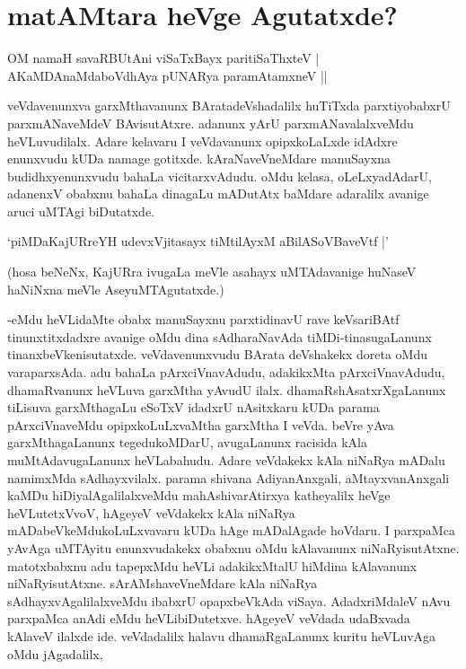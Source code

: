 \chapter{matAMtara heVge Agutatxde?}

\begin{shloka}
OM namaH savaRBUtAni viSaTxBayx paritiSaThxteV |\\
AKaMDAnaMdaboVdhAya pUNARya paramAtamxneV ||
\end{shloka}

veVdavenunxva garxMthavanunx BAratadeVshadalilx huTiTxda parxtiyobabxrU parxmANaveMdeV BAvisutAtxre. adanunx yArU parxmANavalalxveMdu heVLuvudilalx. Adare kelavaru I veVdavanunx opipxkoLaLxde idAdxre enunxvudu kUDa namage gotitxde. kAraNaveVneMdare manuSayxna budidhxyenunxvudu bahaLa vicitarxvAdudu. oMdu kelasa, oLeLxyadAdarU, adanenxV obabxnu bahaLa dinagaLu mADutAtx baMdare adaralilx avanige aruci uMTAgi biDutatxde.

\begin{shloka}
`piMDaKajURreYH udevxVjitasayx tiMtilAyxM aBilASoVBaveVtf |'
\end{shloka}

(hosa beNeNx, KajURra ivugaLa meVle asahayx uMTAdavanige huNaseV haNiNxna meVle AseyuMTAgutatxde.)

-eMdu heVLidaMte obabx manuSayxnu parxtidinavU rave keVsariBAtf tinunxtitxdadxre avanige oMdu dina sAdharaNavAda tiMDi-tinasugaLanunx tinanxbeVkenisutatxde. veVdavenunxvudu BArata deVshakekx doreta oMdu varaparxsAda. adu bahaLa pArxciVnavAdudu, adakikxMta pArxciVnavAdudu, dhamaRvanunx heVLuva garxMtha yAvudU ilalx. dhamaRshAsatxrXgaLanunx tiLisuva garxMthagaLu eSoTxV idadxrU nAsitxkaru kUDa parama pArxciVnaveMdu opipxkoLuLxvaMtha garxMtha I veVda. beVre yAva garxMthagaLanunx tegedukoMDarU, avugaLanunx racisida kAla muMtAdavugaLanunx heVLabahudu. Adare veVdakekx kAla niNaRya mADalu namimxMda sAdhayxvilalx. parama shivana AdiyanAnxgali, aMtayxvanAnxgali kaMDu hiDiyalAgalilalxveMdu mahAshivarAtirxya katheyalilx heVge heVLutetxVvoV, hAgeyeV veVdakekx kAla niNaRya mADabeVkeMdukoLuLxvavaru kUDa hAge mADalAgade hoVdaru. I parxpaMca yAvAga uMTAyitu enunxvudakekx obabxnu oMdu kAlavanunx niNaRyisutAtxne. matotxbabxnu adu tapepxMdu heVLi adakikxMtalU hiMdina kAlavanunx niNaRyisutAtxne. sArAMshaveVneMdare kAla niNaRya sAdhayxvAgalilalxveMdu ibabxrU opapxbeVkAda viSaya. AdadxriMdaleV nAvu parxpaMca anAdi eMdu heVLibiDutetxve. hAgeyeV veVdada udaBxvada kAlaveV ilalxde ide. veVdadalilx halavu dhamaRgaLanunx kuritu heVLuvAga oMdu jAgadalilx, 

